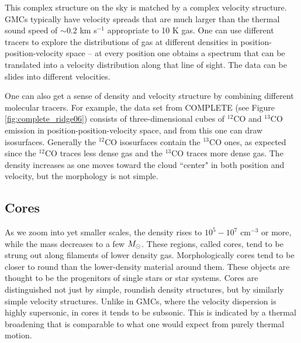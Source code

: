 This complex structure on the sky is matched by a complex velocity structure. GMCs typically have velocity spreads that are much larger than the thermal sound speed of $\sim 0.2$ km s$^{-1}$ appropriate to 10 K gas. One can use different tracers to explore the distributions of gas at different densities in position-position-velocity space -- at every position one obtains a spectrum that can be translated into a velocity distribution along that line of sight. The data can be slides into different velocities.

One can also get a sense of density and velocity structure by combining different molecular tracers. For example, the data set from COMPLETE (see Figure \ref{fig:complete_ridge06}) consists of three-dimensional cubes of $^{12}$CO and $^{13}$CO emission in position-position-velocity space, and from this one can draw isosurfaces. Generally the $^{12}$CO isosurfaces contain the $^{13}$CO ones, as expected since the $^{12}$CO traces less dense gas and the $^{13}$CO traces more dense gas. The density increases as one moves toward the cloud ``center" in both position and velocity, but the morphology is not simple.   

\subsection{Cores}

As we zoom into yet smaller scales, the density rises to $10^5 - 10^7$ cm$^{-3}$ or more, while the mass decreases to a few $M_{\odot}$. These regions, called cores, tend to be strung out along filaments of lower density gas. Morphologically cores tend to be closer to round than the lower-density material around them. These objects are thought to be the progenitors of single stars or star systems. Cores are distinguished not just by simple, roundish density structures, but by similarly simple velocity structures. Unlike in GMCs, where the velocity dispersion is highly supersonic, in cores it tends to be subsonic. This is indicated by a thermal broadening that is comparable to what one would expect from purely thermal motion.


